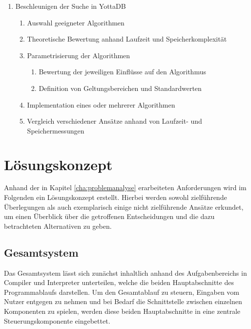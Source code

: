 \documentclass[oneside]{ausarbeitung}
\begin{document}
\begin{enumerate}
	\item Beschleunigen der Suche in YottaDB
	\begin{enumerate}
		\item Auswahl geeigneter Algorithmen 
		\item Theoretische Bewertung anhand Laufzeit und Speicherkomplexität
		\item Parametrisierung der Algorithmen 
		\begin{enumerate}
			\item Bewertung der jeweiligen Einflüsse auf den Algorithmus
			\item Definition von Geltungsbereichen und Standardwerten
		\end{enumerate}
		\item Implementation eines oder mehrerer Algorithmen
		\item Vergleich verschiedener Ansätze anhand von Laufzeit- und Speichermessungen
	\end{enumerate}

\end{enumerate}










\chapter{Lösungskonzept}
\label{cha:loesungskonzept}

Anhand der in Kapitel \ref{cha:problemanalyse} erarbeiteten Anforderungen wird im Folgenden ein Lösungskonzept erstellt. Hierbei werden sowohl zielführende Überlegungen als auch exemplarisch einige nicht zielführende Ansätze erkundet, um einen Überblick über die getroffenen Entscheidungen und die dazu betrachteten Alternativen zu geben.



\section{Gesamtsystem}

Das Gesamtsystem lässt sich zunächst inhaltlich anhand des Aufgabenbereichs in Compiler und Interpreter unterteilen, welche die beiden Hauptabschnitte des Programmablaufs darstellen. Um den Gesamtablauf zu steuern, Eingaben vom Nutzer entgegen zu nehmen und bei Bedarf die Schnittstelle zwischen einzelnen Komponenten zu spielen, werden diese beiden Hauptabschnitte in eine zentrale Steuerungskomponente eingebettet. 
	
\end{document}
